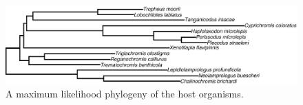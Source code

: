 \begin{figure}
    \includegraphics[width=\textwidth]{figures/mcgee_tree.pdf}
    \caption{A maximum likelihood phylogeny of the host organisms.}
    \label{FP_host_tree}
\end{figure}

